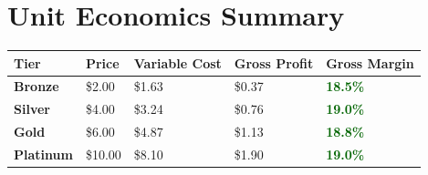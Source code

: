\documentclass[11pt,a4paper]{article}
\begin{document}
\vspace{0.6cm}

\section*{\textcolor{miloprimary}{Unit Economics Summary}}

\begin{center}
\renewcommand{\arraystretch}{1.5}
\begin{tabular}{>{\centering\arraybackslash}p{2.5cm} >{\centering\arraybackslash}p{2cm} >{\centering\arraybackslash}p{2.5cm} >{\centering\arraybackslash}p{2.5cm} >{\centering\arraybackslash}p{2.5cm}}
\toprule
\rowcolor{miloprimary!15}
\textbf{Tier} & \textbf{Price} & \textbf{Variable Cost} & \textbf{Gross Profit} & \textbf{Gross Margin} \\
\midrule
\rowcolor{bronzecolor!8}
\textcolor{bronzecolor}{\textbf{Bronze}} & \$2.00 & \$1.63 & \$0.37 & \textcolor{darkgreen}{\textbf{18.5\%}} \\
\rowcolor{silvercolor!8}
\textcolor{silvercolor}{\textbf{Silver}} & \$4.00 & \$3.24 & \$0.76 & \textcolor{darkgreen}{\textbf{19.0\%}} \\
\rowcolor{goldcolor!8}
\textcolor{goldcolor}{\textbf{Gold}} & \$6.00 & \$4.87 & \$1.13 & \textcolor{darkgreen}{\textbf{18.8\%}} \\
\rowcolor{platinumcolor!8}
\textcolor{platinumcolor}{\textbf{Platinum}} & \$10.00 & \$8.10 & \$1.90 & \textcolor{darkgreen}{\textbf{19.0\%}} \\
\bottomrule
\end{tabular}
\end{center}

\vspace{0.3cm}

\begin{center}
\end{center}
\end{document}
